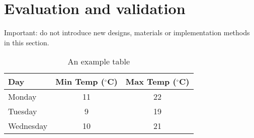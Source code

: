 \chapter{Evaluation and validation}

Important: do not introduce new designs, materials or implementation methods in this section.

\begin{table}[h]\centering
    \caption{An example table}
	\begin{tabular}{|l|c|c|}
		\hline
		Day & Min Temp ($^{\circ}$C) & Max Temp ($^{\circ}$C) \\ \hline
		Monday & 11 & 22 \\ \hline
		Tuesday & 9 & 19 \\ \hline
		Wednesday & 10 & 21 \\
		\hline
	\end{tabular}
	\label{tab:exampleTable}
\end{table}